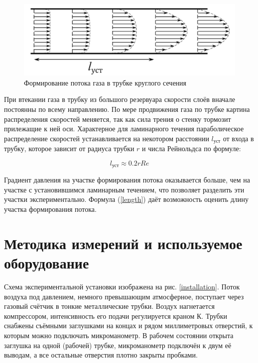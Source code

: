\documentclass[a4paper, 12pt]{article}
\begin{document}
    \begin{figure}[H]
        \centering
        \includegraphics[scale = 0.6]{images/stream.png}
        \caption{Формирование потока газа в трубке круглого сечения}
    \end{figure}
    
    \noindent При втекании газа в трубку из большого резервуара скорости слоёв вначале постоянны по всему направлению. По мере продвижения газа по трубке картина распределения скоростей меняется, так как сила трения о стенку тормозит прилежащие к ней оси. Характерное для ламинарного течения параболическое распределение скоростей устанавливается на некотором расстоянии $l_{\text{уст}}$ от входа в трубку, которое зависит от радиуса трубки $r$ и числа Рейнольдса по формуле:
    
    \begin{equation}
        \label{length}
	l_{\text{уст}} \approx 0.2rRe
    \end{equation}
    
    \noindent Градиент давления на участке формирования потока оказывается больше, чем на участке с установившимся ламинарным течением, что позволяет разделить эти участки экспериментально. Формула (\ref{length}) даёт возможность оценить длину участка формирования потока.
    
    \section*{Методика измерений и используемое оборудование}

    \noindent Схема экспериментальной установки изображена на рис. \ref{installation}. Поток воздуха под давлением, немного превышающим атмосферное, поступает через газовый счётчик в тонкие металлические трубки. Воздух нагнетается компрессором, интенсивность его подачи регулируется краном К. Трубки снабжены съёмными заглушками на концах и рядом миллиметровых отверстий, к которым можно подключать микроманометр. В рабочем состоянии открыта заглушка на одной (рабочей) трубке, микроманометр подключён к двум её выводам, а все остальные отверстия плотно закрыты пробками.
\end{document}
